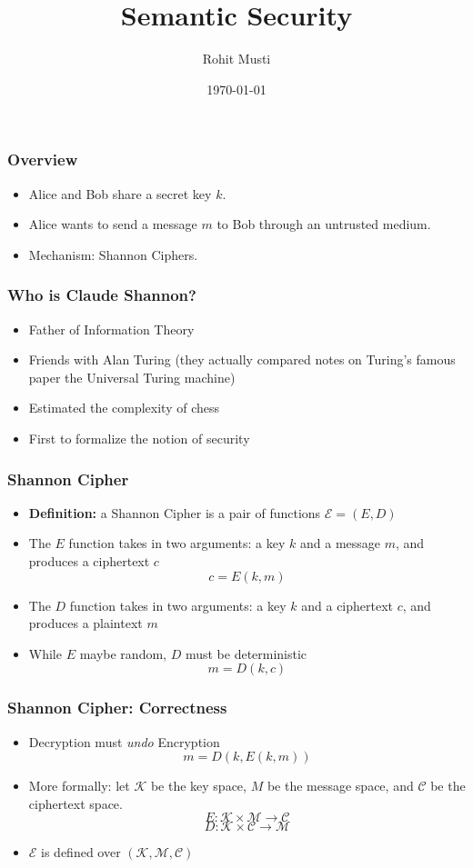 \documentclass{beamer}
\title{Semantic Security}
\author{Rohit Musti}
\institute{CUNY - Hunter College}
\date{\today}
\begin{document}
 
\frame{\titlepage}


\begin{frame}
\frametitle{Overview}
\begin{itemize}
    \item Alice and Bob share a secret key \(k\). \pause
    \item Alice wants to send a message \(m\) to Bob through an untrusted medium. \pause
    \item Mechanism: Shannon Ciphers.
\end{itemize}
\end{frame}

\begin{frame}
\frametitle{Who is Claude Shannon?}
\begin{itemize}
    \item Father of Information Theory \pause
    \item Friends with Alan Turing (they actually compared notes on Turing's famous paper the Universal Turing machine) \pause
    \item Estimated the complexity of chess \pause
    \item First to formalize the notion of security
\end{itemize}
\end{frame}

\begin{frame}
\frametitle{Shannon Cipher}
\begin{itemize}
    \item \textbf{Definition:} a Shannon Cipher is a pair of functions \(\mathcal{E} = (E, D)\)\pause
    \item The \(E\) function takes in two arguments: a key \(k\) and a message \(m\), and produces a ciphertext \(c\) \[c = E(k, m)\] \pause
    \item The \(D\) function takes in two arguments: a key \(k\) and a ciphertext \(c\), and produces a plaintext \(m\) \pause
    \item While \(E\) maybe random, \(D\) must be deterministic
    \[m = D(k, c)\]
\end{itemize}
\end{frame}

\begin{frame}
\frametitle{Shannon Cipher: Correctness}
\begin{itemize}
    \item Decryption must \textit{undo} Encryption \pause \[m = D(k, E(k, m))\]
    \item More formally: let \(\mathcal{K}\) be the key space, \(M\) be the message space, and \(\mathcal{C}\) be the ciphertext space.
    \pause \[E: \mathcal{K} \times \mathcal{M} \rightarrow \mathcal{C}\]
    \pause \[D: \mathcal{K} \times \mathcal{C} \rightarrow \mathcal{M}\] \pause
    \item \(\mathcal{E}\) is defined over \((\mathcal{K}, \mathcal{M}, \mathcal{C})\)
\end{itemize}
\end{frame}
\end{document}
